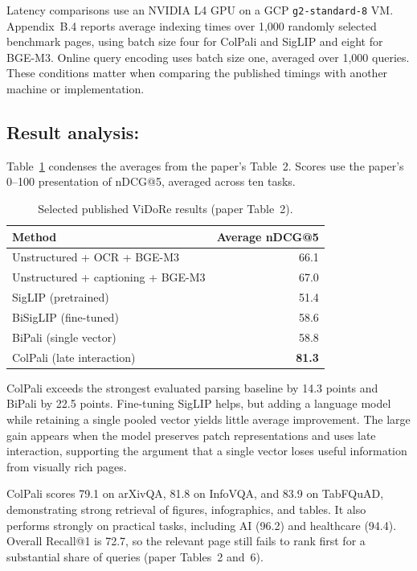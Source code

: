 \documentclass[11pt,a4paper]{article}
\begin{document}
Latency comparisons use an NVIDIA L4 GPU on a GCP \texttt{g2-standard-8} VM. Appendix~B.4 reports average indexing times over 1,000 randomly selected benchmark pages, using batch size four for ColPali and SigLIP and eight for BGE-M3. Online query encoding uses batch size one, averaged over 1,000 queries. These conditions matter when comparing the published timings with another machine or implementation.

\subsection{Result analysis:}
Table~\ref{tab:main-results} condenses the averages from the paper's Table~2. Scores use the paper's 0--100 presentation of nDCG@5, averaged across ten tasks.
\begin{table}[htbp]
    \centering
    \begin{tabular}{lr}
        \toprule
        Method & Average nDCG@5 \\
        \midrule
        Unstructured + OCR + BGE-M3 & 66.1 \\
        Unstructured + captioning + BGE-M3 & 67.0 \\
        SigLIP (pretrained) & 51.4 \\
        BiSigLIP (fine-tuned) & 58.6 \\
        BiPali (single vector) & 58.8 \\
        ColPali (late interaction) & \textbf{81.3} \\
        \bottomrule
    \end{tabular}
    \caption{Selected published ViDoRe results (paper Table~2).}
    \label{tab:main-results}
\end{table}

ColPali exceeds the strongest evaluated parsing baseline by 14.3 points and BiPali by 22.5 points. Fine-tuning SigLIP helps, but adding a language model while retaining a single pooled vector yields little average improvement. The large gain appears when the model preserves patch representations and uses late interaction, supporting the argument that a single vector loses useful information from visually rich pages.

ColPali scores 79.1 on arXivQA, 81.8 on InfoVQA, and 83.9 on TabFQuAD, demonstrating strong retrieval of figures, infographics, and tables. It also performs strongly on practical tasks, including AI (96.2) and healthcare (94.4). Overall Recall@1 is 72.7, so the relevant page still fails to rank first for a substantial share of queries (paper Tables~2 and~6).
\end{document}
